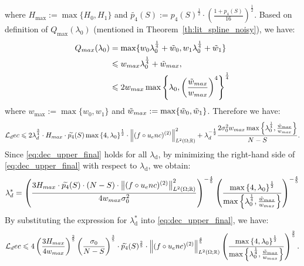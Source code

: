 \documentclass{article}
\def\encs{u_\textrm{enc}}
\def\declamb{\lambda_\textrm{d}}
\def\ldec{\mathcal{L}_\textrm{dec}}
\newcommand{\norm}[1]{\left\lVert#1\right\rVert}
\newcommand{\lp}[1]{{L}^{#1}\left(\Omega; \mathbb{R}\right)}
\begin{document}
where $H_{\textrm{max}}:=\max \{H_0, H_1\}$ and $\widetilde{p_4}(S):=p_4(S)^\frac{1}{2} \cdot \left(\frac{1+p_4(S)}{16}\right)^\frac{1}{2}$. Based on definition of $Q_{\textrm{max}}(\lambda_0)$ (mentioned in Theorem~\ref{th:lit_spline_noisy}), we have:
\begin{align}
    Q_{\textrm{max}}(\lambda_0) &= \max \{w_0\lambda_0^\frac{1}{4} + \Tilde{w}_0, w_1\lambda_0^\frac{1}{4} + \Tilde{w}_1\} \nonumber \\
    &\leqslant w_{\textrm{max}}\lambda_0^\frac{1}{4} + \Tilde{w}_{\textrm{max}},
    \nonumber \\
    &\leqslant 2w_{\textrm{max}}\max \left\{\lambda_0, \left(\frac{\Tilde{w}_{\textrm{max}}}{w_{\textrm{max}}}\right)^4 \right\}^\frac{1}{4}
\end{align}
where $w_{\textrm{max}}:=\max \{w_0, w_1\}$ and $\Tilde{w}_{\textrm{max}}:= \max \{\Tilde{w}_0, \Tilde{w}_1\}$. Therefore we have:
\begin{align}
    \ldec \leqslant 2\declamb^{\frac{3}{4}}\cdot H_{\textrm{max}}\cdot \widetilde{p_4}(S)\max \left\{4, \lambda_0\right\}^\frac{1}{2} \cdot \norm{(f\circ\encs)^{(2)}}^2_{\lp{2}} + \declamb^{-\frac{1}{2}}\frac{2\sigma_0^2 w_{\textrm{max}}\max\left\{\lambda_0^\frac{1}{4}, \frac{\Tilde{w}_{\textrm{max}}}{w_{\textrm{max}}} \right\}}{N-S}.
\end{align}
Since \eqref{eq:dec_upper_final} holds for all $\declamb$, by minimizing the right-hand side of \eqref{eq:dec_upper_final} with respect to $\declamb$, we obtain:
\begin{align}
    \declamb^* = \left(\frac{3H_{\textrm{max}}\cdot \widetilde{p_4}(S) \cdot (N-S)\cdot\norm{(f\circ\encs)^{(2)}}^2_{\lp{2}}}{4w_{\textrm{max}}\sigma_0^2} \right)^{-\frac{4}{5}} \left(\frac{\max \left\{4, \lambda_0\right\}^\frac{1}{2}}{\max\left\{\lambda_0^\frac{1}{4}, \frac{\Tilde{w}_{\textrm{max}}}{w_{\textrm{max}}} \right\}}\right)^{-\frac{4}{5}}
\end{align}
By substituting the expression for $\declamb^*$ into \eqref{eq:dec_upper_final}, we have:
\begin{align}
    \ldec \leqslant 4\left(\frac{3H_{\textrm{max}}}{4w_{\textrm{max}}}\right)^{\frac{2}{5}} \left(\frac{\sigma_0}{N-S}\right)^\frac{3}{5} \cdot \widetilde{p_4}(S)^\frac{2}{5}\cdot \norm{(f\circ\encs)^{(2)}}^\frac{4}{5}_{\lp{2}} \left(\frac{\max \left\{4, \lambda_0\right\}^\frac{1}{2}}{\max\left\{\lambda_0^\frac{1}{4}, \frac{\Tilde{w}_{\textrm{max}}}{w_{\textrm{max}}} \right\}}\right)^{\frac{2}{5}}.
\end{align}
\end{document}
